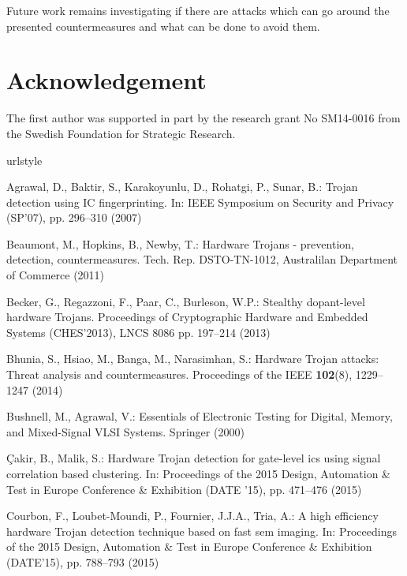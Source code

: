 \documentclass[a4paper]{llncs}
\begin{document}
Future work remains investigating if there are attacks which can go around the presented countermeasures and what can be done to avoid them.

\section*{Acknowledgement}
The first author was supported in part by the research grant No SM14-0016 from the Swedish Foundation for Strategic Research.
 


\begin{thebibliography}{10}
\providecommand{\url}[1]{{#1}}
\providecommand{\urlprefix}{URL }
\expandafter\ifx\csname urlstyle\endcsname\relax
  \providecommand{\doi}[1]{DOI~\discretionary{}{}{}#1}\else
  \providecommand{\doi}{DOI~\discretionary{}{}{}\begingroup
  \urlstyle{rm}\Url}\fi

Agrawal, D., Baktir, S., Karakoyunlu, D., Rohatgi, P., Sunar, B.: Trojan
  detection using {IC} fingerprinting.
\newblock In: IEEE Symposium on Security and Privacy (SP'07), pp. 296--310
  (2007)

Beaumont, M., Hopkins, B., Newby, T.: Hardware {T}rojans - prevention,
  detection, countermeasures.
\newblock Tech. Rep. DSTO-TN-1012, Australilan Department of Commerce (2011)

Becker, G., Regazzoni, F., Paar, C., Burleson, W.P.: Stealthy dopant-level
  hardware {T}rojans.
\newblock Proceedings of Cryptographic Hardware and Embedded Systems
  (CHES'2013), LNCS 8086 pp. 197--214 (2013)

Bhunia, S., Hsiao, M., Banga, M., Narasimhan, S.: Hardware {T}rojan attacks:
  Threat analysis and countermeasures.
\newblock Proceedings of the IEEE \textbf{102}(8), 1229--1247 (2014)

Bushnell, M., Agrawal, V.: Essentials of Electronic Testing for Digital,
  Memory, and Mixed-Signal {VLSI} Systems.
\newblock Springer (2000)

\c{C}akir, B., Malik, S.: Hardware {T}rojan detection for gate-level ics using
  signal correlation based clustering.
\newblock In: Proceedings of the 2015 Design, Automation \& Test in Europe
  Conference \& Exhibition (DATE '15), pp. 471--476 (2015)

Courbon, F., Loubet-Moundi, P., Fournier, J.J.A., Tria, A.: A high efficiency
  hardware {T}rojan detection technique based on fast sem imaging.
\newblock In: Proceedings of the 2015 Design, Automation \& Test in Europe
  Conference \& Exhibition (DATE'15), pp. 788--793 (2015)


\end{thebibliography}
\end{document}
